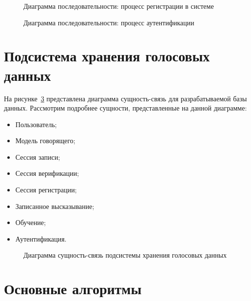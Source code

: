 \begin{figure}
    \center{
        \fontsize{12}{14}\selectfont
        
    }
    \caption{Диаграмма последовательности: процесс регистрации в системе}
    \label{fig:seq_enrollment}
\end{figure}


\begin{figure}
    \center{
        \fontsize{12}{14}\selectfont
        
    }
    \caption{Диаграмма последовательности: процесс аутентификации}
    \label{fig:seq_verification}
\end{figure}

\section{Подсистема хранения голосовых данных}

На рисунке~\ref{fig:er_main} представлена диаграмма сущность-связь для разрабатываемой базы данных. Рассмотрим подробнее сущности, представленные на данной диаграмме:

\begin{itemize}
\item Пользователь;
\item Модель говорящего;
\item Сессия записи;
\item Сессия верификации;
\item Сессия регистрации;
\item Записанное высказывание;
\item Обучение;
\item Аутентификация.
\end{itemize}

\begin{figure}
    
    \caption{Диаграмма сущность-связь подсистемы хранения голосовых данных}
    \label{fig:er_main}
\end{figure}


\section{Основные алгоритмы}

